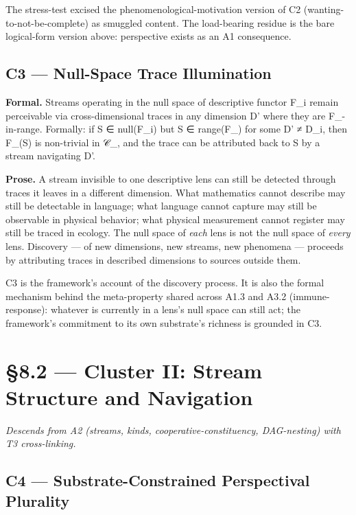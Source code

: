 \documentclass[11pt, openany]{book}
\newcommand{\sectionbreak}{\clearpage}
\begin{document}
The stress-test excised the phenomenological-motivation version of C2 (wanting-to-not-be-complete) as smuggled content. The load-bearing residue is the bare logical-form version above: perspective exists as an A1 consequence.

\subsection{C3 --- Null-Space Trace Illumination}

\textbf{Formal.} Streams operating in the null space of descriptive functor F\_\allowbreak{}i remain perceivable via cross-dimensional traces in any dimension D' where they are F\_-in-range. Formally: if S ∈ null(F\_\allowbreak{}i) but S ∈ range(F\_) for some D' ≠ D\_\allowbreak{}i, then F\_(S) is non-trivial in 𝒞\_, and the trace can be attributed back to S by a stream navigating D'.

\textbf{Prose.} A stream invisible to one descriptive lens can still be detected through traces it leaves in a different dimension. What mathematics cannot describe may still be detectable in language; what language cannot capture may still be observable in physical behavior; what physical measurement cannot register may still be traced in ecology. The null space of \textit{each} lens is not the null space of \textit{every} lens. Discovery --- of new dimensions, new streams, new phenomena --- proceeds by attributing traces in described dimensions to sources outside them.

C3 is the framework's account of the discovery process. It is also the formal mechanism behind the meta-property shared across A1.3 and A3.2 (immune-response): whatever is currently in a lens's null space can still act; the framework's commitment to its own substrate's richness is grounded in C3.

\sectionbreak

\section{§8.2 --- Cluster II: Stream Structure and Navigation}

\textit{Descends from A2 (streams, kinds, cooperative-constituency, DAG-nesting) with T3 cross-linking.}

\subsection{C4 --- Substrate-Constrained Perspectival Plurality}
\end{document}
